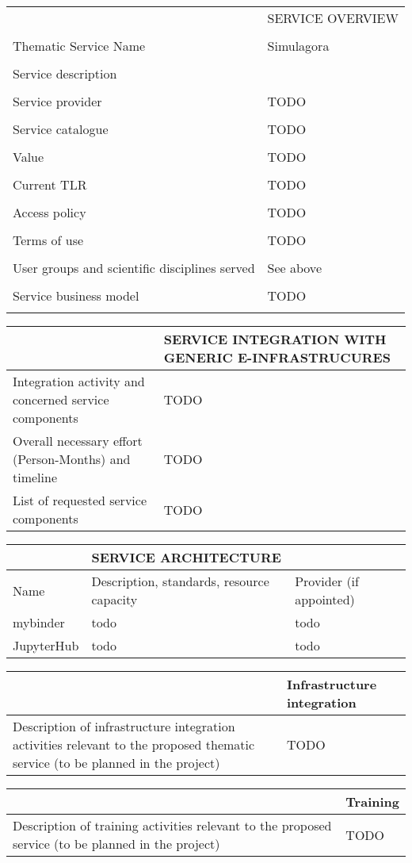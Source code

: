 \begin{tabular}{|p{7cm}|p{7cm}|}
\hline
 & SERVICE OVERVIEW\\
\\\hline
Thematic Service Name&Simulagora\\
\\\hline
Service description&\\
\\\hline
Service provider&TODO\\
\\\hline
Service catalogue&TODO\\
\\\hline
Value&TODO\\
\\\hline
Current TLR&TODO\\
\\\hline
Access policy&TODO\\
\\\hline
Terms of use&TODO\\
\\\hline
User groups and scientific disciplines served&See above\\
\\\hline
Service business model&TODO\\
\\\hline
\end{tabular}


\begin{tabular}{|p{7cm}|p{7cm}|}
&SERVICE INTEGRATION WITH GENERIC E-INFRASTRUCURES
\\\hline
Integration activity and concerned service components&TODO
\\\hline
Overall necessary effort (Person-Months) and timeline&TODO
\\\hline
List of requested service components&TODO
\\\hline
\end{tabular}

\begin{tabular}{|l|l|l|}
&SERVICE ARCHITECTURE&
\\\hline
Name&Description, standards, resource capacity&Provider (if appointed)
\\\hline
mybinder&todo&todo
\\\hline
JupyterHub&todo&todo
\\\hline
\end{tabular}

\begin{tabular}{|p{7cm}|l|}
  &Infrastructure integration
  \\\hline
  Description of infrastructure integration activities relevant to the proposed thematic service (to be planned in the project)&TODO
  \\\hline
\end{tabular}

\begin{tabular}{|p{7cm}|l|}
  &Training
  \\\hline
  Description of training activities relevant to the proposed service (to be planned in the project)&TODO
  \\\hline
\end{tabular}
